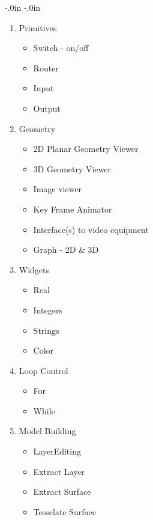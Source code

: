 % 
% 
%

\topmargin -0.45in
\textheight 9.0in
\oddsidemargin -.0in
\evensidemargin -.0in
\textwidth 6.5in




\begin{enumerate}
\item Primitives
\begin{itemize}
\item Switch - on/off
\item Router
\item Input
\item Output
\end{itemize}

\item Geometry
\begin{itemize}
\item 2D Planar Geometry Viewer
\item 3D Geometry Viewer
\item Image viewer
\item Key Frame Animator
\item Interface(s) to video equipment
\item Graph - 2D \& 3D
\end{itemize}

\item Widgets
\begin{itemize}
\item Real
\item Integers
\item Strings
\item Color
\end{itemize}

\item Loop Control
\begin{itemize}
\item For
\item While
\end{itemize}


\item Model Building
\begin{itemize}
\item LayerEditing
\item Extract Layer
\item Extract Surface
\item Tesselate Surface
\end{itemize}


\end{enumerate}
